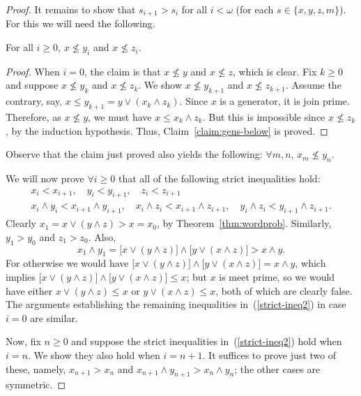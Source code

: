 \begin{proof}
It remains to show that $s_{i+1} > s_i$ for all $i<\omega$ (for each $s \in \{x, y, z, m\}$).  
For this we will need the following.

\begin{claim}\label{claim:gens-below} For all $i \geq 0$, $x\nleq y_i$ and $x \nleq z_i$.
\end{claim}
\begin{proof}
When $i=0$, the claim is that $x\nleq y$ and $x \nleq z$, which is clear.  
Fix $k\geq 0$ and suppose $x\nleq y_k$ and $x \nleq z_k$. We show 
$x\nleq y_{k+1}$ and $x \nleq z_{k+1}$.
Assume the contrary, say, $x\leq y_{k+1} = y \vee (x_k \wedge z_k)$.
Since $x$ is a generator, it is join prime. Therefore, as $x\nleq y$, we must have
$x \leq x_k \wedge z_k$. But this is impossible since 
$x \nleq z_k$, by the induction hypothesis. Thus, Claim~\ref{claim:gens-below} is proved.
\end{proof}
Observe that the claim just proved also yields the following: $\forall m, n$, $x_m \nleq y_n$. 

We will now prove $\forall i \geq 0$ that all of the following strict inequalities hold:
\begin{gather}
x_i < x_{i+1}, \quad y_i < y_{i+1}, \quad z_i < z_{i+1}\nonumber \\
x_i \wedge y_i < x_{i+1} \wedge  y_{i+1}, \quad 
x_i \wedge z_i < x_{i+1} \wedge  z_{i+1}, \quad 
y_i \wedge z_i < y_{i+1} \wedge  z_{i+1}.\label{strict-ineq2}
\end{gather}
Clearly $x_1 = x \vee (y \wedge z) > x = x_0$, by Theorem~\ref{thm:wordprob}. 
Similarly, $y_1 > y_0$ and $z_1 > z_0$.  
Also, 
\[
x_1 \wedge y_1 = \bigl[x \vee (y \wedge z)\bigr] \wedge \bigl[y \vee (x \wedge z)\bigr]
 > x \wedge y.\]
For otherwise we would have
$\bigl[x \vee (y \wedge z)\bigr] \wedge \bigl[y \vee (x \wedge z)\bigr]
= x \wedge y$, which implies
$\bigl[x \vee (y \wedge z)\bigr] \wedge \bigl[y \vee (x \wedge z)\bigr]
\leq x$; but $x$ is meet prime, so we would have
either $x \vee (y \wedge z) \leq x$ or 
$y \vee (x \wedge z)\leq x$, both of which are clearly false.
The arguments establishing the remaining inequalities in~(\ref{strict-ineq2}) 
in case $i=0$ are similar.

Now, fix $n\geq 0$ and suppose the strict
inequalities in~(\ref{strict-ineq2}) hold when $i=n$.
We show they also hold when $i = n+1$.  It suffices to prove just two of these, namely,
$x_{n+1} > x_n$ and $x_{n+1} \wedge y_{n+1} > x_n \wedge y_n$; the other cases are symmetric. 


\end{proof}
